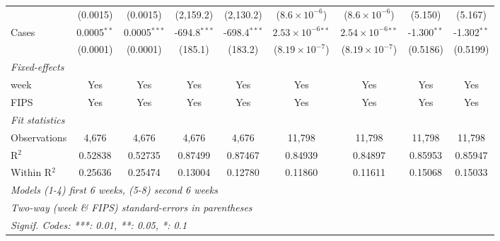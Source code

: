\documentclass[12pt,a4]{article}
\begin{document}
\begin{landscape}
\begin{table}
{\begin{tabular}{lcccccccc}
      &(0.0015) & (0.0015) & (2,159.2) & (2,130.2) & ($8.6\times 10^{-6}$) & ($8.6\times 10^{-6}$) & (5.150) & (5.167)\\
    Cases&0.0005$^{**}$ & 0.0005$^{***}$ & -694.8$^{***}$ & -698.4$^{***}$ & $2.53\times 10^{-6}$$^{**}$ & $2.54\times 10^{-6}$$^{**}$ & -1.300$^{**}$ & -1.302$^{**}$\\
      &(0.0001) & (0.0001) & (185.1) & (183.2) & ($8.19\times 10^{-7}$) & ($8.19\times 10^{-7}$) & (0.5186) & (0.5199)\\
    \midrule \emph{Fixed-effects}&   &   &   &   &   &   &   &  \\
    week & Yes & Yes & Yes & Yes & Yes & Yes & Yes & Yes\\
    FIPS & Yes & Yes & Yes & Yes & Yes & Yes & Yes & Yes\\
    \midrule \emph{Fit statistics}&  & & & & & & & \\
    Observations & 4,676&4,676&4,676&4,676&11,798&11,798&11,798&11,798\\
    R$^2$ & 0.52838&0.52735&0.87499&0.87467&0.84939&0.84897&0.85953&0.85947\\
    Within R$^2$ & 0.25636&0.25474&0.13004&0.12780&0.11860&0.11611&0.15068&0.15033\\
    \midrule\midrule
    \multicolumn{9}{l}{\emph{Models (1-4) first 6 weeks, (5-8) second 6 weeks}}\\
    \multicolumn{9}{l}{\emph{Two-way (week \& FIPS) standard-errors in parentheses}}\\
    \multicolumn{9}{l}{\emph{Signif. Codes: ***: 0.01, **: 0.05, *: 0.1}}\\
    \end{tabular}}
  \end{table}



\end{landscape}
\end{document}
